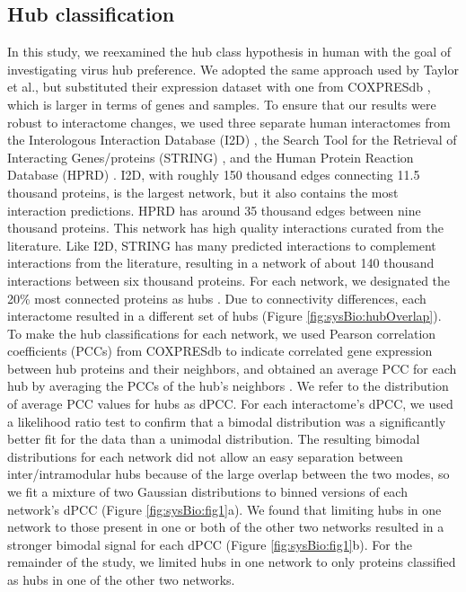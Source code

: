 \subsection{Hub classification}

In this study, we reexamined the hub class hypothesis in human with
the goal of investigating virus hub preference. We adopted the same
approach used by Taylor et al., but substituted their expression
dataset with one from COXPRESdb \cite{obayashi07}, which is larger in
terms of genes and samples. To ensure that our results were robust to
interactome changes, we used three separate human interactomes from
the Interologous Interaction Database (I2D) \cite{brown05}, the Search
Tool for the Retrieval of Interacting Genes/proteins (STRING)
\cite{von07}, and the Human Protein Reaction Database (HPRD)
\cite{prasad08}. I2D, with roughly 150 thousand edges connecting 11.5
thousand proteins, is the largest network, but it also contains the
most interaction predictions. HPRD has around 35 thousand edges
between nine thousand proteins. This network has high quality
interactions curated from the literature. Like I2D, STRING has many
predicted interactions to complement interactions from the literature,
resulting in a network of about 140 thousand interactions between six
thousand proteins. For each network, we designated the 20\% most
connected proteins as hubs \cite{bertin07}. Due to connectivity
differences, each interactome resulted in a different set of hubs
(Figure \ref{fig:sysBio:hubOverlap}). To make the hub classifications
for each network, we used Pearson correlation coefficients (PCCs) from
COXPRESdb to indicate correlated gene expression between hub proteins
and their neighbors, and obtained an average PCC for each hub by
averaging the PCCs of the hub's neighbors \cite{han04,taylor09}. We
refer to the distribution of average PCC values for hubs as dPCC. For
each interactome's dPCC, we used a likelihood ratio test
\cite{ertel08} to confirm that a bimodal distribution was a
significantly better fit for the data than a unimodal
distribution. The resulting bimodal distributions for each network did
not allow an easy separation between inter/intramodular hubs because
of the large overlap between the two modes, so we fit a mixture of two
Gaussian distributions to binned versions of each network's dPCC
(Figure \ref{fig:sysBio:fig1}a). We found that limiting hubs in one
network to those present in one or both of the other two networks
resulted in a stronger bimodal signal for each dPCC (Figure
\ref{fig:sysBio:fig1}b). For the remainder of the study, we limited
hubs in one network to only proteins classified as hubs in one of the
other two networks.

